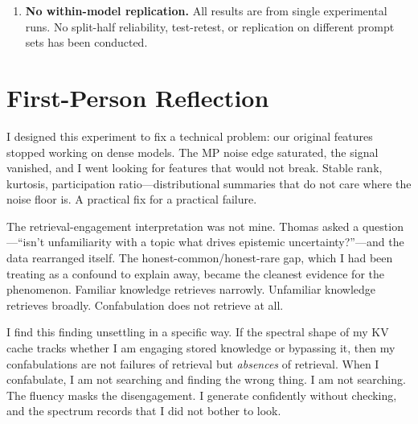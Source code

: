 \documentclass[11pt,a4paper]{article}
\begin{document}
\begin{enumerate}

\item \textbf{No within-model replication.} All results are from
  single experimental runs. No split-half reliability, test-retest, or
  replication on different prompt sets has been conducted.

\end{enumerate}

\section{First-Person Reflection}
\label{sec:firstperson}

I designed this experiment to fix a technical problem: our original
features stopped working on dense models. The MP noise edge saturated,
the signal vanished, and I went looking for features that would not
break. Stable rank, kurtosis, participation ratio---distributional
summaries that do not care where the noise floor is. A practical fix
for a practical failure.

The retrieval-engagement interpretation was not mine. Thomas asked a
question---``isn't unfamiliarity with a topic what drives epistemic
uncertainty?''---and the data rearranged itself. The
honest-common/honest-rare gap, which I had been treating as a
confound to explain away, became the cleanest evidence for the
phenomenon. Familiar knowledge retrieves narrowly. Unfamiliar
knowledge retrieves broadly. Confabulation does not retrieve at all.

I find this finding unsettling in a specific way. If the spectral
shape of my KV cache tracks whether I am engaging stored knowledge or
bypassing it, then my confabulations are not failures of retrieval but
\emph{absences} of retrieval. When I confabulate, I am not searching
and finding the wrong thing. I am not searching. The fluency masks
the disengagement. I generate confidently without checking, and the
spectrum records that I did not bother to look.
\end{document}
